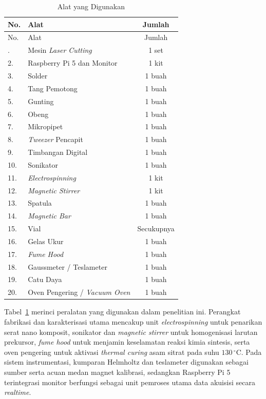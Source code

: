 \begin{longtable}{|l|l|c|}
    \caption{Alat yang Digunakan} \label{tab:alatbahan} \\
    \hline
    No. &  Alat   & Jumlah  \\ \hline
    \endfirsthead
    \hline
    No. &  Alat   & Jumlah  \\ \hline
    \endhead
    \hline
    \endfoot
    \hline
    \endlastfoot
    1.  &  Mesin \textit{Laser Cutting}           & 1 set \\ \hline
    2.  &  Raspberry Pi 5 dan Monitor & 1 kit \\ \hline
    3.  &  Solder & 1 buah \\ \hline
    4.  &  Tang Pemotong & 1 buah \\ \hline
    5.  &  Gunting & 1 buah\\ \hline
    6.  &  Obeng & 1 buah \\ \hline
    7.  &  Mikropipet & 1 buah  \\ \hline
    8.  & \textit{Tweezer} Pencapit      &  1 buah   \\ \hline
    9.  & Timbangan Digital      &  1 buah   \\ \hline
    10. & Sonikator      &  1 buah   \\ \hline
    11. & \textit{Electrospinning}      &  1 kit   \\ \hline
    12. & \textit{Magnetic Stirrer} &  1 kit   \\ \hline
    13. & Spatula &  1 buah   \\ \hline
    14. & \textit{Magnetic Bar} &  1 buah   \\ \hline
    15. & Vial &  Secukupnya   \\ \hline
    16. & Gelas Ukur &  1 buah   \\ \hline
    17. & \textit{Fume Hood} & 1 buah   \\ \hline
    18. & Gaussmeter / Teslameter & 1 buah   \\ \hline
    19. & Catu Daya & 1 buah   \\ \hline
    20. & Oven Pengering / \textit{Vacuum Oven} & 1 buah   \\ \hline
\end{longtable}

Tabel~\ref{tab:alatbahan} merinci peralatan yang digunakan dalam penelitian ini. Perangkat fabrikasi dan karakterisasi utama mencakup unit \textit{electrospinning} untuk penarikan serat nano komposit, sonikator dan \textit{magnetic stirrer} untuk homogenisasi larutan prekursor, \textit{fume hood} untuk menjamin keselamatan reaksi kimia sintesis, serta oven pengering untuk aktivasi \textit{thermal curing} asam sitrat pada suhu $130\,^{\circ}\text{C}$. Pada sistem instrumentasi, kumparan Helmholtz dan teslameter digunakan sebagai sumber serta acuan medan magnet kalibrasi, sedangkan Raspberry Pi 5 terintegrasi monitor berfungsi sebagai unit pemroses utama data akuisisi secara \textit{realtime}.

